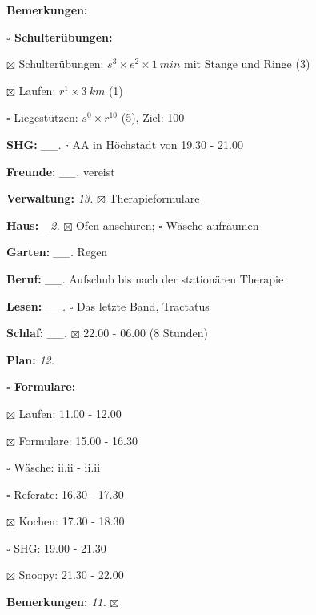 \documentclass[10pt,a4paper]{article}
\newcommand\prop[1] {{\color {alizarin} {\bf #1}}}             %
\newcommand\mand[1] {{\color {burntorange} {\bf #1}}}          %
\newcommand\topspace{\vskip -15pt \hskip 20pt}
\newcommand\bottomspace{\vskip 4pt}
\newcommand\n[1] { {\sl #1.} \hskip 5pt }
\begin{document}
\begin{mdframed}[style=daystyle]
\begin{labeling}{{\mand {Bemerkungen:}}}
\begin{minipage}{0.75\textwidth}
\begin{labeling}{\prop {$\square$ {Schulterübungen:}}}
      \item[$\boxtimes$ Schulterübungen:] $s^3 \times e^2 \times 1\ min$ mit Stange und Ringe (3)
      \item[$\boxtimes$ Laufen:]          $r^1 \times 3\ km$ (1)
      \item[$\square$ Liegestützen:]    $s^0 \times r^{10}$ (5), Ziel: 100
      \end{labeling}
    \end{minipage}
    \bottomspace        
  \item[{\mand {SHG:}}]          \n{\_\_} $\square$ AA in Höchstadt von 19.30 - 21.00
  \item[{\mand {Freunde:}}]      \n{\_\_} vereist
  \item[{\mand {Verwaltung:}}]     \n{13} $\boxtimes$ Therapieformulare
  \item[{\mand {Haus:}}]          \n{\_2} $\boxtimes$ Ofen anschüren; $\square$ Wäsche aufräumen
  \item[{\mand {Garten:}}]       \n{\_\_} Regen
  \item[{\mand {Beruf:}}]        \n{\_\_} Aufschub bis nach der stationären Therapie
  \item[{\mand {Lesen:}}]        \n{\_\_} $\square$ Das letzte Band, Tractatus
  \item[{\mand {Schlaf:}}]       \n{\_\_} $\boxtimes$ 22.00 - 06.00 (8 Stunden)
  \item[{\mand {Plan:}}]           \n{12}
    \topspace
    \begin{minipage}{0.75\textwidth}  
      \begin{labeling}{\prop {$\square$ {Formulare:}}} 
        \setlength\itemsep{-3pt}
      \item[$\boxtimes$ Laufen:]     11.00 - 12.00
      \item[$\boxtimes$ Formulare:]  15.00 - 16.30
      \item[$\square$ Wäsche:]       ii.ii - ii.ii
      \item[$\square$ Referate:]     16.30 - 17.30
      \item[$\boxtimes$ Kochen:]     17.30 - 18.30
      \item[$\square$ SHG:]          19.00 - 21.30
      \item[$\boxtimes$ Snoopy:]     21.30 - 22.00
      \end{labeling}
    \end{minipage}
    \bottomspace
  \item[{\mand {Bemerkungen:}}]    \n{11} $\boxtimes$
  \end{labeling}
  

\end{mdframed}
\end{document}
